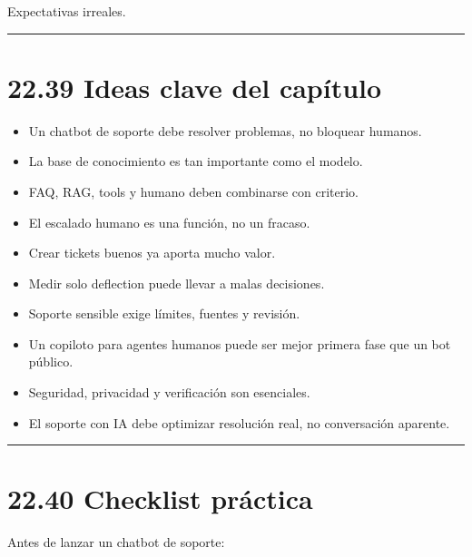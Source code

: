 Expectativas irreales.

\begin{center}\rule{0.5\linewidth}{0.5pt}\end{center}

\section{22.39 Ideas clave del
capítulo}\label{ideas-clave-del-capuxedtulo-21}

\begin{itemize}
\tightlist
\item
  Un chatbot de soporte debe resolver problemas, no bloquear humanos.
\item
  La base de conocimiento es tan importante como el modelo.
\item
  FAQ, RAG, tools y humano deben combinarse con criterio.
\item
  El escalado humano es una función, no un fracaso.
\item
  Crear tickets buenos ya aporta mucho valor.
\item
  Medir solo deflection puede llevar a malas decisiones.
\item
  Soporte sensible exige límites, fuentes y revisión.
\item
  Un copiloto para agentes humanos puede ser mejor primera fase que un
  bot público.
\item
  Seguridad, privacidad y verificación son esenciales.
\item
  El soporte con IA debe optimizar resolución real, no conversación
  aparente.
\end{itemize}

\begin{center}\rule{0.5\linewidth}{0.5pt}\end{center}

\section{22.40 Checklist práctica}\label{checklist-pruxe1ctica-21}

Antes de lanzar un chatbot de soporte:

